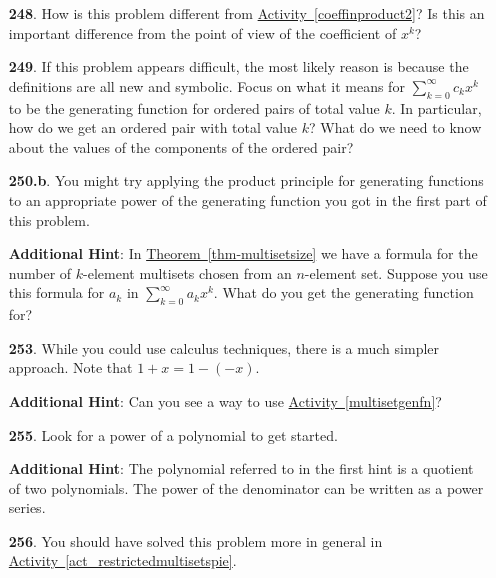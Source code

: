 \documentclass[10pt,]{book}
\theoremstyle{plain}
\theoremstyle{definition}
\theoremstyle{definition}
\theoremstyle{definition}
\numberwithin{equation}{chapter}
\begin{document}
\begin{itemize}[itemsep=1em]
\item[\textbf{248}.]\hypertarget{p-1294}{}%
How is this problem different from \hyperref[coeffinproduct2]{Activity~\ref{coeffinproduct2}}? Is this an important difference from the point of view of the coefficient of \(x^k\)?%

\item[\textbf{249}.]\hypertarget{p-1299}{}%
If this problem appears difficult, the most likely reason is because the definitions are all new and symbolic. Focus on what it means for \(\sum_{k=0}^\infty c_kx^k\) to be the generating function for ordered pairs of total value \(k\). In particular, how do we get an ordered pair with total value \(k\)? What do we need to know about the values of the components of the ordered pair?%

\item[\textbf{250.b}.]\hypertarget{p-1308}{}%
You might try applying the product principle for generating functions to an appropriate power of the generating function you got in the first part of this problem.%

\par\smallskip
\noindent\textbf{Additional Hint}: \hypertarget{p-1309}{}%
In \hyperref[thm-multisetsize]{Theorem~\ref{thm-multisetsize}} we have a formula for the number of \(k\)-element multisets chosen from an \(n\)-element set. Suppose you use this formula for \(a_k\) in \(\sum_{k=0}^\infty a_kx^k\). What do you get the generating function for?%

\item[\textbf{253}.]\hypertarget{p-1317}{}%
While you could use calculus techniques, there is a much simpler approach. Note that \(1 + x = 1 - (-x)\).%

\par\smallskip
\noindent\textbf{Additional Hint}: \hypertarget{p-1318}{}%
Can you see a way to use \hyperref[multisetgenfn]{Activity~\ref{multisetgenfn}}?%

\item[\textbf{255}.]\hypertarget{p-1323}{}%
Look for a power of a polynomial to get started.%

\par\smallskip
\noindent\textbf{Additional Hint}: \hypertarget{p-1324}{}%
The polynomial referred to in the first hint is a quotient of two polynomials.  The power of the denominator can be written as a power series.%

\item[\textbf{256}.]\hypertarget{p-1328}{}%
You should have solved this problem more in general in \hyperref[act_restrictedmultisetspie]{Activity~\ref{act_restrictedmultisetspie}}.%


\end{itemize}
\end{document}

